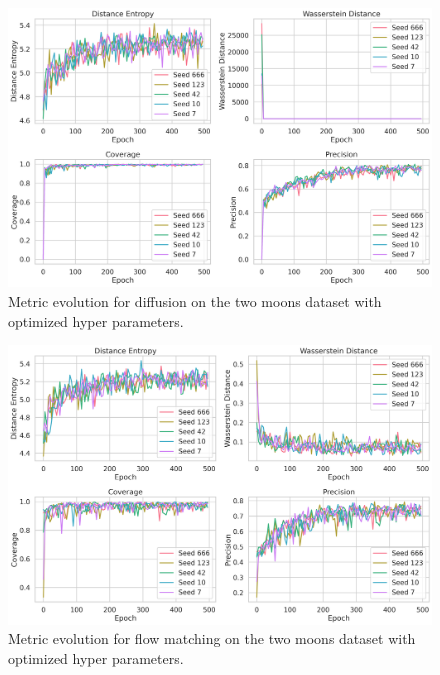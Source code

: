 \documentclass{article}
\begin{document}
\begin{figure}[tb]
    \includegraphics[width=\linewidth]{images/multiseed/diffusion_two_moons_metrics_comparison_optimized}
    \caption{Metric evolution for diffusion on the two moons dataset with optimized hyper parameters.}
    \label{fig:diffusion_two_moons_metrics_comparison_optimized}
\end{figure}

\begin{figure}[tb]
    \includegraphics[width=\linewidth]{images/multiseed/flow_matching_two_moons_metrics_comparison_optimized}
    \caption{Metric evolution for flow matching on the two moons dataset with optimized hyper parameters.}
    \label{fig:flow_matching_two_moons_metrics_comparison_optimized}
\end{figure}



\end{document}
